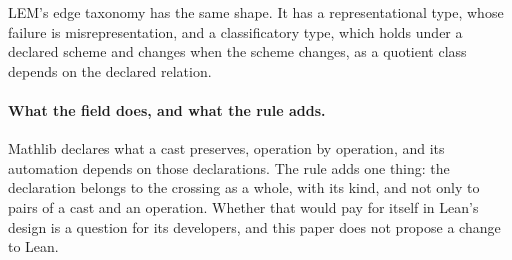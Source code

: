 LEM's edge taxonomy has the same shape. It has a representational type, whose failure is
misrepresentation, and a classificatory type, which holds under a declared scheme and
changes when the scheme changes, as a quotient class depends on the declared relation.

\paragraph{What the field does, and what the rule adds.} Mathlib declares what a cast
preserves, operation by operation, and its automation depends on those declarations. The
rule adds one thing: the declaration belongs to the crossing as a whole, with its kind,
and not only to pairs of a cast and an operation. Whether that would pay for itself in
Lean's design is a question for its developers, and this paper does not propose a change
to Lean.
